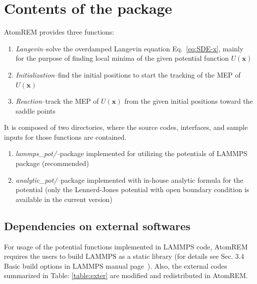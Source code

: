 \documentclass[preprint,12pt]{elsarticle}
\begin{document}
\section{Contents of the package}
\label{sec:contents}
AtomREM provides three functions:
\begin{enumerate}
\item
{\it Langevin}--solve the overdamped Langevin equation Eq.~\ref{eq:SDE-x}, mainly for the purpose of finding local minima of the given potential function $U({\bm x})$

\item
{\it Initialization}--find the initial positions to start the tracking of the MEP of $U({\bm x})$

\item
{\it Reaction}--track the MEP of $U({\bm x})$ from the given initial positions toward the saddle points

\end{enumerate}
It is composed of two directories, where the source codes, interfaces, and sample inputs for those functions are contained.
\begin{enumerate}

\item
{\it lammps\_pot/}--package implemented for utilizing the potentials of LAMMPS package (recommended)

\item
{\it analytic\_pot/}--package implemented with in-house analytic formula for the potential (only the Lennerd-Jones potential with open boundary condition is available in the current version)

\end{enumerate}

\subsection{Dependencies on external softwares}

For usage of the potential functions implemented in LAMMPS code, AtomREM requires the users to build LAMMPS as a static library (for details see Sec. 3.4 Basic build options in LAMMPS manual page~\cite{LAMMPS}). Also, the external codes summarized in Table: \ref{table:exter} are modified and redistributed in AtomREM. 
\end{document}

